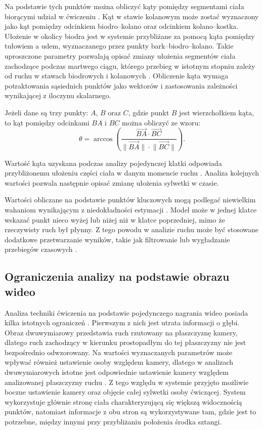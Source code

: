 Na podstawie tych punktów można obliczyć kąty pomiędzy segmentami ciała biorącymi udział w ćwiczeniu \cite{wade2022markerless}. Kąt w stawie kolanowym może zostać wyznaczony jako kąt pomiędzy odcinkiem biodro--kolano oraz odcinkiem kolano--kostka. Ułożenie w okolicy biodra jest w systemie przybliżane za pomocą kąta pomiędzy tułowiem a udem, wyznaczanego przez punkty bark--biodro--kolano. Takie uproszczone parametry pozwalają opisać zmiany ułożenia segmentów ciała zachodzące podczas martwego ciągu, którego przebieg w istotnym stopniu zależy od ruchu w stawach biodrowych i kolanowych \cite{hanen2025deadlift}. Obliczenie kąta wymaga potraktowania sąsiednich punktów jako wektorów i zastosowania zależności wynikającej z iloczynu skalarnego.

Jeżeli dane są trzy punkty: $A$, $B$ oraz $C$, gdzie punkt $B$ jest wierzchołkiem kąta, to kąt pomiędzy odcinkami $BA$ i $BC$ można obliczyć ze wzoru:
\begin{equation}
\theta =
\arccos
\left(
\frac{
\vec{BA} \cdot \vec{BC}
}{
\lVert \vec{BA} \rVert \cdot \lVert \vec{BC} \rVert
}
\right).
\end{equation}

Wartość kąta uzyskana podczas analizy pojedynczej klatki odpowiada przybliżonemu ułożeniu części ciała w danym momencie ruchu \cite{wade2022markerless}. Analiza kolejnych wartości pozwala następnie opisać zmianę ułożenia sylwetki w czasie.

Wartości obliczane na podstawie punktów kluczowych mogą podlegać niewielkim wahaniom wynikającym z niedokładności estymacji \cite{wade2022markerless}. Model może w jednej klatce wskazać punkt nieco wyżej lub niżej niż w klatce poprzedniej, mimo że rzeczywisty ruch był płynny. Z tego powodu w analizie ruchu może być stosowane dodatkowe przetwarzanie wyników, takie jak filtrowanie lub wygładzanie przebiegów czasowych \cite{wade2022markerless}.

\subsection{Ograniczenia analizy na podstawie obrazu wideo}

Analiza techniki ćwiczenia na podstawie pojedynczego nagrania wideo posiada kilka istotnych ograniczeń \cite{wade2022markerless}. Pierwszym z nich jest utrata informacji o głębi. Obraz dwuwymiarowy przedstawia ruch rzutowany na płaszczyznę kamery, dlatego ruch zachodzący w kierunku prostopadłym do tej płaszczyzny nie jest bezpośrednio odwzorowany. Na wartości wyznaczanych parametrów może wpływać również ustawienie osoby względem kamery, dlatego w analizach dwuwymiarowych istotne jest odpowiednie ustawienie kamery względem analizowanej płaszczyzny ruchu \cite{wade2022markerless}. Z tego względu w systemie przyjęto możliwie boczne ustawienie kamery oraz objęcie całej sylwetki osoby ćwiczącej. System wykorzystuje głównie stronę ciała charakteryzującą się większą widocznością punktów, natomiast informacje z obu stron są wykorzystywane tam, gdzie jest to potrzebne, między innymi przy przybliżaniu położenia środka sztangi.

